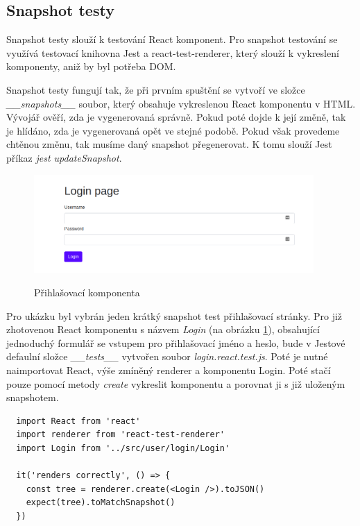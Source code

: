 \documentclass[thesis=M,czech]{FITthesis}[2018/10/20]
\begin{document}
\subsection{Snapshot testy}
Snapshot testy slouží k testování React komponent. Pro snapshot testování se využívá testovací knihovna Jest a react-test-renderer, který slouží k vykreslení komponenty, aniž by byl potřeba DOM. 

Snapshot testy fungují tak, že při prvním spuštění se vytvoří ve složce \textit{\_\_snapshots\_\_} soubor, který obsahuje vykreslenou React komponentu v HTML. Vývojář ověří, zda je vygenerovaná správně. Pokud poté dojde k její změně, tak je hlídáno, zda je vygenerovaná opět ve stejné podobě. Pokud však provedeme chtěnou změnu, tak musíme daný snapshot přegenerovat. K tomu slouží Jest příkaz \textit{jest updateSnapshot}.

\begin{figure}[h]
\caption{Přihlašovací komponenta}
\centering
\includegraphics[width=0.95\textwidth]{login}
\label{fig:login}
\end{figure}

Pro ukázku byl vybrán jeden krátký snapshot test přihlašovací stránky. Pro již zhotovenou React komponentu s názvem \textit{Login} (na obrázku \ref{fig:login}), obsahující jednoduchý formulář se vstupem pro přihlašovací jméno a heslo, bude v Jestové defaulní složce \textit{\_\_tests\_\_} vytvořen soubor \textit{login.react.test.js}. Poté je nutné naimportovat React, výše zmíněný renderer a komponentu Login. Poté stačí pouze pomocí metody \textit{create} vykreslit komponentu a porovnat ji s již uloženým snapshotem.
\begin{lstlisting}
  import React from 'react'
  import renderer from 'react-test-renderer'
  import Login from '../src/user/login/Login'
  
  it('renders correctly', () => {
    const tree = renderer.create(<Login />).toJSON()
    expect(tree).toMatchSnapshot()
  })

\end{lstlisting}
\end{document}
